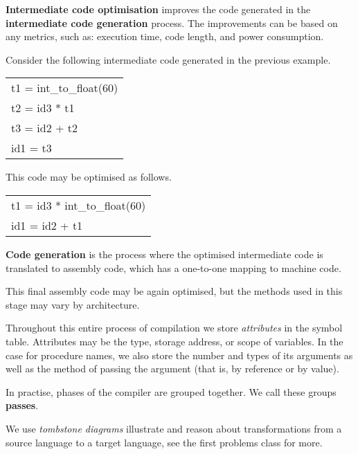 \begin{definition}
    \textbf{Intermediate code optimisation} improves the code generated in the
    \textbf{intermediate code generation} process.
    The improvements can be based on any metrics, such as:
    execution time, code length, and power consumption.
\end{definition}

\begin{example} 
    Consider the following intermediate code generated in the previous example.
    \begin{center}
        \ttfamily
        \begin{tabular}{l}
            \toprule
            t1 = int\_to\_float(60) \\
            t2 = id3 * t1 \\
            t3 = id2 + t2 \\
            id1 = t3 \\
            \bottomrule
        \end{tabular}
    \end{center}
    This code may be optimised as follows. 
    \begin{center}
        \ttfamily
        \begin{tabular}{l}
            \toprule
            t1 = id3 * int\_to\_float(60) \\
            id1 = id2 + t1 \\
            \bottomrule
        \end{tabular}
    \end{center}
\end{example}

\begin{definition}
    \textbf{Code generation} is the process where the optimised intermediate
    code is translated to assembly code, which has a one-to-one mapping to
    machine code.
\end{definition}

This final assembly code may be again optimised, but the methods used in this
stage may vary by architecture.

Throughout this entire process of compilation we store \emph{attributes} in the
symbol table. 
Attributes may be the type, storage address, or scope of 
variables.
In the case for procedure names, 
we also store the number and types of its arguments
as well as the method of passing the argument 
(that is, by reference or by value).

In practise, phases of the compiler are grouped together. 
We call these groups \textbf{passes}.

We use \emph{tombstone diagrams} illustrate and reason about transformations
from a source language to a target language, see the first problems class
for more.

